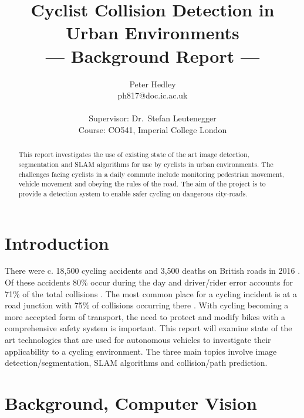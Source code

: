 \documentclass[a4paper,11pt,notitlepage]{article}
\title{Cyclist Collision Detection in Urban Environments \\\Large{--- Background Report ---}}
\author{Peter Hedley\\
       ph817@doc.ic.ac.uk\\ \\
       \small{Supervisor: Dr.\ Stefan Leutenegger}\\
       \small{Course: CO541, Imperial College London}
}
\begin{document}
\maketitle

\begin{abstract}
This report investigates the use of existing state of the art image detection, segmentation and SLAM algorithms for use by cyclists in urban environments. The challenges facing cyclists in a daily commute include monitoring pedestrian movement, vehicle movement and obeying the rules of the road. The aim of the project is to provide a detection system to enable safer cycling on dangerous city-roads.

\end{abstract}
\clearpage

\tableofcontents

\clearpage
\section{Introduction}
There were c. 18,500 cycling accidents and 3,500 deaths on British roads in 2016 \cite{DFT_fig}. Of these accidents 80\% occur during the day and driver/rider error accounts for 71\% of the total collisions \cite{DFT_fig2}. The most common place for a cycling incident is at a road junction with 75\% of collisions occurring there \cite{DFT_fig3}. With cycling becoming a more accepted form of transport, the need to protect and modify bikes with a comprehensive safety system is important.
\newline\newline
This report will examine state of the art technologies that are used for autonomous vehicles to investigate their applicability to a cycling environment. The three main topics involve image detection/segmentation, SLAM algorithms and collision/path prediction. 

\newpage
\section{Background, Computer Vision}\label{comp_vis_back}
\end{document}
